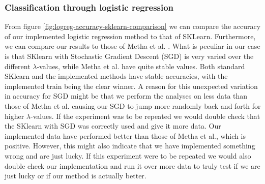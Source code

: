 \subsubsection{Classification through logistic regression}
From figure \ref{fig:logreg-accuracy-sklearn-comparison} we can compare the accuracy of our implemented logistic regression method to that of SKLearn. Furthermore, we can compare our results to those of Metha et al. \cite{2018arXiv180308823M}. What is peculiar in our case is that SKlearn with Stochastic Gradient Descent (SGD) is very varied over the different $\lambda$-values, while Metha et al. have quite stable values. Both standard SKlearn and the implemented methods have stable accuracies, with the implemented train being the clear winner. A reason for this unexpected variation in accuracy for SGD might be that we perform the analyses on less data than those of Metha et al. causing our SGD to jump more randomly back and forth for higher $\lambda$-values. If the experiment was to be repeated we would double check that the SKlearn with SGD was correctly used and give it more data. Our implemented data have performed better than those of Metha et al., which is positive. However, this might also indicate that we have implemented something wrong and are just lucky. If this experiment were to be repeated we would also double check our implementation and run it over more data to truly test if we are just lucky or if our method is actually better.
